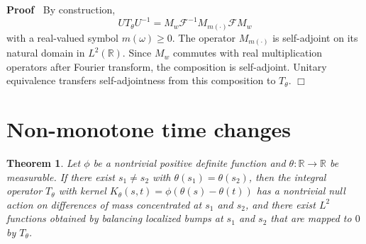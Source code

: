 \documentclass{article}
\newcommand{\cdummy}{\cdot}
\newenvironment{proof}{\noindent\textbf{Proof\ }}{\hspace*{\fill}$\Box$\medskip}
{\theorembodyfont{\rmfamily}\newtheorem{example}{Example}}
\newtheorem{theorem}{Theorem}
\begin{document}
\begin{proof}
  By construction,
  \begin{equation}
    UT_{\theta} U^{- 1} = M_w \mathcal{F}^{- 1} M_{m (\cdummy)} \mathcal{F}M_w
  \end{equation}
  with a real-valued symbol $m (\omega) \geq 0$. The operator $M_{m
  (\cdummy)}$ is self-adjoint on its natural domain in $L^2 (\mathbb{R})$.
  Since $M_w$ commutes with real multiplication operators after Fourier
  transform, the composition is self-adjoint. Unitary equivalence transfers
  self-adjointness from this composition to $T_{\theta}$.
\end{proof}

\section{Non-monotone time changes}

\begin{theorem}
  Let $\phi$ be a nontrivial positive definite function and $\theta :
  \mathbb{R} \to \mathbb{R}$ be measurable. If there exist $s_1 \neq s_2$ with
  $\theta (s_1) = \theta (s_2)$, then the integral operator $T_{\theta}$ with
  kernel $K_{\theta} (s, t) = \phi (\theta (s) - \theta (t))$ has a nontrivial
  null action on differences of mass concentrated at $s_1$ and $s_2$, and
  there exist $L^2$ functions obtained by balancing localized bumps at $s_1$
  and $s_2$ that are mapped to $0$ by $T_{\theta}$.
\end{theorem}
\end{document}
